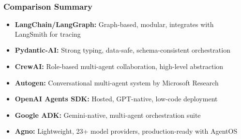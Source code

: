 \begin{frame}[fragile]\frametitle{Comparison Summary}
    \begin{itemize}
        \item \textbf{LangChain/LangGraph:} Graph-based, modular, integrates with LangSmith for tracing
        \item \textbf{Pydantic-AI:} Strong typing, data-safe, schema-consistent orchestration
        \item \textbf{CrewAI:} Role-based multi-agent collaboration, high-level abstraction
        \item \textbf{Autogen:} Conversational multi-agent system by Microsoft Research
        \item \textbf{OpenAI Agents SDK:} Hosted, GPT-native, low-code deployment
        \item \textbf{Google ADK:} Gemini-native, multi-agent orchestration suite
        \item \textbf{Agno:} Lightweight, 23+ model providers, production-ready with AgentOS
    \end{itemize}
\end{frame}
